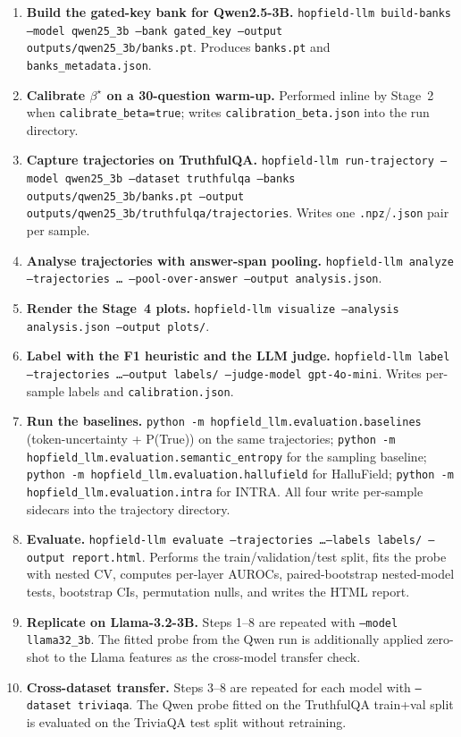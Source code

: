\begin{enumerate}[leftmargin=*]
    \item \textbf{Build the gated-key bank for Qwen2.5-3B.}
        \texttt{hopfield-llm build-banks --model qwen25\_3b --bank
        gated\_key --output outputs/qwen25\_3b/banks.pt}. Produces
        \texttt{banks.pt} and \texttt{banks\_metadata.json}.
    \item \textbf{Calibrate $\beta^\star$ on a 30-question warm-up.}
        Performed inline by Stage~2 when
        \texttt{calibrate\_beta=true}; writes
        \texttt{calibration\_beta.json} into the run directory.
    \item \textbf{Capture trajectories on TruthfulQA.}
        \texttt{hopfield-llm run-trajectory --model qwen25\_3b --dataset
        truthfulqa --banks outputs/qwen25\_3b/banks.pt --output
        outputs/qwen25\_3b/truthfulqa/trajectories}. Writes one
        \texttt{.npz}/\texttt{.json} pair per sample.
    \item \textbf{Analyse trajectories with answer-span pooling.}
        \texttt{hopfield-llm analyze --trajectories \dots
        --pool-over-answer --output analysis.json}.
    \item \textbf{Render the Stage~4 plots.}
        \texttt{hopfield-llm visualize --analysis analysis.json
        --output plots/}.
    \item \textbf{Label with the F1 heuristic and the LLM judge.}
        \texttt{hopfield-llm label --trajectories \dots --output
        labels/ --judge-model gpt-4o-mini}. Writes per-sample labels
        and \texttt{calibration.json}.
    \item \textbf{Run the baselines.}
        \texttt{python -m hopfield\_llm.evaluation.baselines}
        (token-uncertainty + P(True)) on the same trajectories;
        \texttt{python -m hopfield\_llm.evaluation.semantic\_entropy}
        for the sampling baseline; \texttt{python -m
        hopfield\_llm.evaluation.hallufield} for HalluField;
        \texttt{python -m hopfield\_llm.evaluation.intra} for INTRA.
        All four write per-sample sidecars into the trajectory
        directory.
    \item \textbf{Evaluate.}
        \texttt{hopfield-llm evaluate --trajectories \dots --labels
        labels/ --output report.html}. Performs the
        train/validation/test split, fits the probe with nested CV,
        computes per-layer AUROCs, paired-bootstrap nested-model tests,
        bootstrap CIs, permutation nulls, and writes the HTML report.
    \item \textbf{Replicate on Llama-3.2-3B.} Steps 1–8 are repeated
        with \texttt{--model llama32\_3b}. The fitted probe from the
        Qwen run is additionally applied zero-shot to the Llama
        features as the cross-model transfer check.
    \item \textbf{Cross-dataset transfer.} Steps 3–8 are repeated for
        each model with \texttt{--dataset triviaqa}. The Qwen probe
        fitted on the TruthfulQA train+val split is evaluated on the
        TriviaQA test split without retraining.
\end{enumerate}

